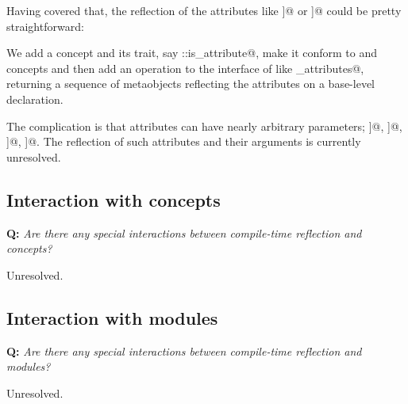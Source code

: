 Having covered that, the reflection of the  attributes like
\verb@[[attr1]]@ or \verb@[[namespace::attr2]]@ could be pretty straightforward:

We add a  concept and its trait, say \verb@meta::is_attribute@,
make it conform to  and  concepts and then add an
operation to the interface of  like \verb@get_attributes@, returning
a sequence of metaobjects reflecting the attributes on a base-level declaration.

The complication is that attributes can have nearly arbitrary parameters;
\verb@[[probably(true)]]@, \verb@[[deprecated("reason")]]@,
\verb@[[visibility(hidden)]]@, \verb@[[gnu::aligned(64)]]@. The reflection of
such attributes and their arguments is currently unresolved.

\subsection{Interaction with concepts}

\textbf{Q:} {\em Are there any special interactions between compile-time
reflection and concepts?}

Unresolved.

\subsection{Interaction with modules}

\textbf{Q:} {\em Are there any special interactions between compile-time
reflection and modules?}

Unresolved.

